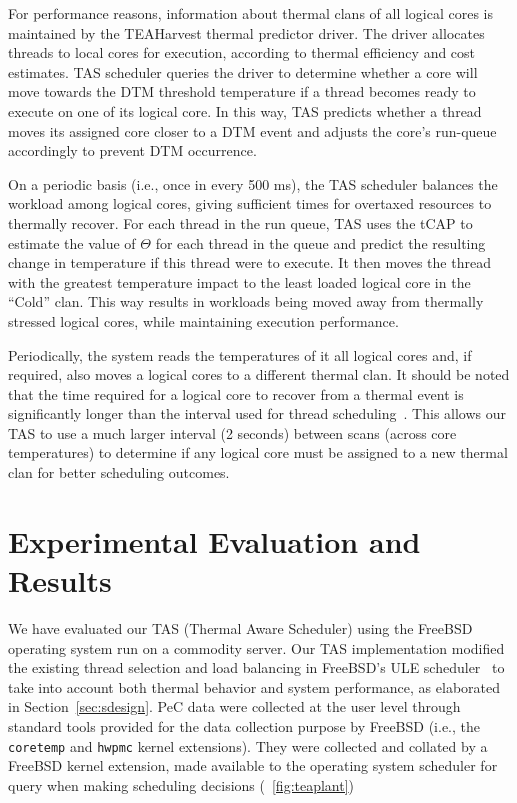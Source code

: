 \documentclass[times, 10pt,twocolumn]{IEEEtran}
\begin{document}
For performance reasons, information about thermal clans of all logical
cores is maintained by the TEAHarvest thermal predictor driver.  The
driver allocates threads to local cores for execution, according to
thermal efficiency and cost estimates.  TAS scheduler queries the driver
to determine whether a core will move towards the DTM threshold
temperature if a thread becomes ready to execute on one of its logical
core.  In this way, TAS predicts whether a thread moves its assigned
core closer to a DTM event and adjusts the core's run-queue accordingly
to prevent DTM occurrence.

On a periodic basis (i.e., once in every 500 ms), the TAS scheduler
balances the workload among logical cores, giving sufficient times for
overtaxed resources to thermally recover.  For each thread in the run
queue, TAS uses the tCAP to estimate the value of $\Theta$ for each
thread in the queue and predict the resulting change in temperature if
this thread were to execute.  It then moves the thread with the greatest
temperature impact to the least loaded logical core in the ``Cold''
clan.  This way results in workloads being moved away from thermally
stressed logical cores, while maintaining execution performance.

Periodically, the system reads the temperatures of it all logical cores
and, if required, also moves a logical cores to a different thermal
clan.  It should be noted that the time required for a logical core to
recover from a thermal event is significantly longer than the interval
used for thread scheduling~\cite{Choi2007}. This allows our TAS to use a
much larger interval (2 seconds) between scans (across core
temperatures) to determine if any logical core must be assigned to a new
thermal clan for better scheduling outcomes.

\section{Experimental Evaluation and Results}
\label{sec:experiment} 
We have evaluated our TAS (Thermal Aware Scheduler) using the FreeBSD
operating system run on a commodity server.  Our TAS implementation
modified the existing thread selection and load balancing in FreeBSD's ULE
scheduler~\cite{McKusick2004} to take into account both thermal behavior
and system performance, as elaborated in Section~\ref{sec:sdesign}.  PeC
data were collected at the user level through standard tools provided
for the data collection purpose by FreeBSD (i.e., the \texttt{coretemp}
and \texttt{hwpmc} kernel extensions).  They were collected and collated
by a FreeBSD kernel extension, made available to the operating system
scheduler for query when making scheduling decisions
(\figurename~\ref{fig:teaplant})
\end{document}
